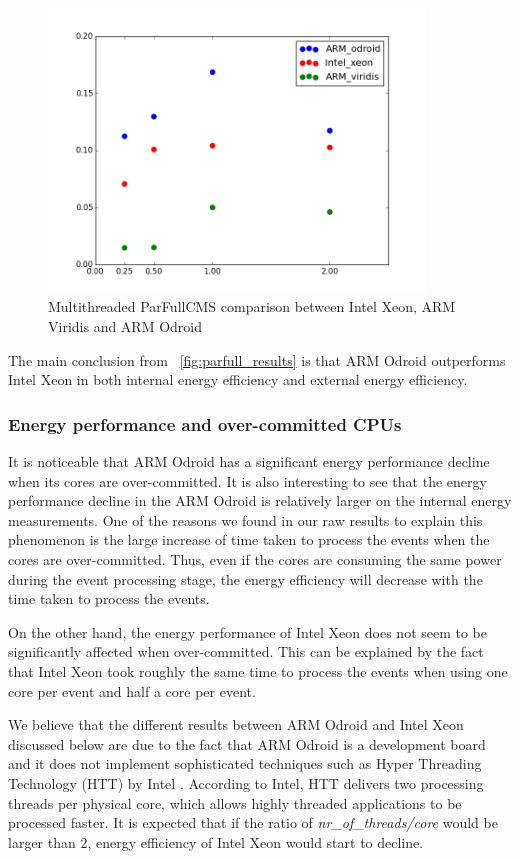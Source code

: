 \begin{figure}[h]
  \centering
    \includegraphics[width=100mm]{"img/aalto/parfull_results_aalto"}
    \caption{Multithreaded ParFullCMS comparison between Intel Xeon, ARM Viridis and ARM Odroid}
    \label{fig:parfull_results_aalto}
\end{figure}

The main conclusion from ~\ref{fig:parfull_results} is that ARM Odroid outperforms Intel Xeon in both internal energy efficiency and external energy efficiency.

\subsubsection*{Energy performance and over-committed CPUs}

It is noticeable that ARM Odroid has a significant energy performance decline when its cores are over-committed. It is also interesting to see that the energy performance decline in the ARM Odroid is relatively larger on the internal energy measurements. One of the reasons we found in our raw results to explain this phenomenon is the large increase of time taken to process the events when the cores are over-committed. Thus, even if the cores are consuming the same power during the event processing stage, the energy efficiency will decrease with the time taken to process the events.  

On the other hand, the energy performance of Intel Xeon does not seem to be significantly affected when over-committed. This can be explained by the fact that Intel Xeon took roughly the same time to process the events when using one core per event and half a core per event.

We believe that the different results between ARM Odroid and Intel Xeon discussed below are due to the fact that ARM Odroid is a development board and it does not implement sophisticated techniques such as Hyper Threading Technology (HTT) by Intel \cite{HTT}. According to Intel, HTT delivers two processing threads per physical core, which allows highly threaded applications to be processed faster. It is expected that if the ratio of  \textit{nr\_of\_threads/core} would be larger than 2, energy efficiency of Intel Xeon would start to decline.  

